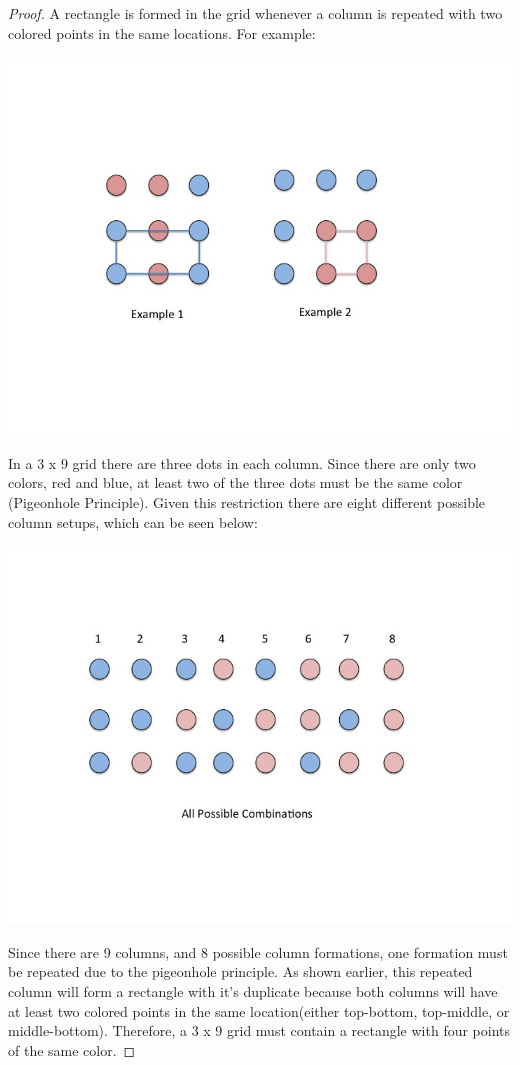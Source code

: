 \documentclass[10pt,letter]{article}
\begin{document}
\begin{proof}
A rectangle is formed in the grid whenever a column is repeated with two colored points in the same locations. For example: \\
\begin{minipage}{.8\textwidth}
\includegraphics[width=.8\linewidth]{Slide1.jpg}
\end{minipage}

In a 3 x 9 grid there are three dots in each column. Since there are only two colors, red and blue, at least two of the three dots must be the same color (Pigeonhole Principle). Given this restriction there are eight different possible column setups, which can be seen below:

\begin{minipage}{.8\textwidth}
\includegraphics[width=.8\linewidth]{Slide2.jpg}
\end{minipage}

Since there are 9 columns, and 8 possible column formations, one formation must be repeated due to the pigeonhole principle. As shown earlier, this repeated column will form a rectangle with it's duplicate because both columns will have at least two colored points in the same location(either top-bottom, top-middle, or middle-bottom). Therefore, a 3 x 9 grid must contain a rectangle with four points of the same color. 
\end{proof}
\end{document}
